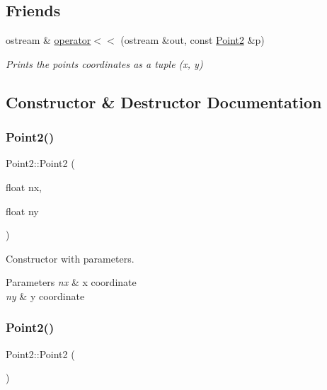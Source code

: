 \subsection*{Friends}
\begin{DoxyCompactItemize}
\item 
ostream \& \mbox{\hyperlink{class_point2_a58c9796662791cf4c9e78ab4825cfef9}{operator$<$$<$}} (ostream \&out, const \mbox{\hyperlink{class_point2}{Point2}} \&p)
\begin{DoxyCompactList}\small\item\em Prints the point\textquotesingle{}s coordinates as a tuple (x, y) \end{DoxyCompactList}\end{DoxyCompactItemize}


\subsection{Constructor \& Destructor Documentation}
\mbox{\label{class_point2_aacbc4e0dd668e79bb7b830dde3cb1f9b}} 
\subsubsection{\texorpdfstring{Point2()}{Point2()}\hspace{0.1cm}{\footnotesize\ttfamily [1/2]}}
{\footnotesize\ttfamily Point2\+::\+Point2 (\begin{DoxyParamCaption}\item[{float}]{nx,  }\item[{float}]{ny }\end{DoxyParamCaption})}



Constructor with parameters. 


\begin{DoxyParams}{Parameters}
{\em nx} & x coordinate \\
\hline
{\em ny} & y coordinate \\
\hline
\end{DoxyParams}
\mbox{\label{class_point2_a8d40ddb5c8e0ce8e26b725f37782e08b}} 
\subsubsection{\texorpdfstring{Point2()}{Point2()}\hspace{0.1cm}{\footnotesize\ttfamily [2/2]}}
{\footnotesize\ttfamily Point2\+::\+Point2 (\begin{DoxyParamCaption}{ }\end{DoxyParamCaption})}



